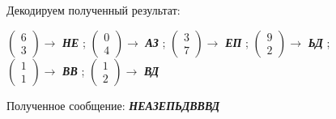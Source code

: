 \documentclass[a5paper, 10pt]{article}
\theoremstyle{definition}
\theoremstyle{plain}
\theoremstyle{remark}
\begin{document}
Декодируем полученный результат:
\begin{center}
 $ \begin{pmatrix}
 6\\
3
\end{pmatrix} \to$ \textbf{\textit{НЕ}} ;
 $ \begin{pmatrix}
 0\\
4
\end{pmatrix} \to$ \textbf{\textit{АЗ}} ;
 $ \begin{pmatrix}
 3\\
7
\end{pmatrix} \to$ \textbf{\textit{ЕП}} ;
 $ \begin{pmatrix}
9\\
2
\end{pmatrix} \to$ \textbf{\textit{ЬД}} ; \\
 $ \begin{pmatrix}
 1\\
1
\end{pmatrix} \to$ \textbf{\textit{ВВ}} ;
$\begin{pmatrix}
 1\\
2
\end{pmatrix} \to$ \textbf{\textit{ВД}}  \\
\end{center}
Полученное сообщение:  \textbf{\textit{НЕАЗЕПЬДВВВД}}
\end{document}
